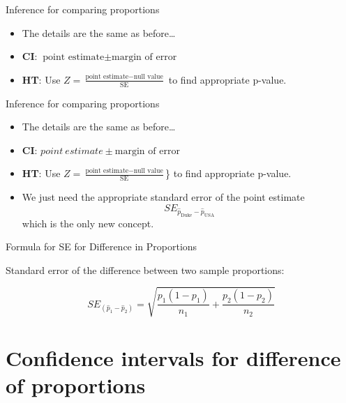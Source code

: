 \documentclass[
  ignorenonframetext,
]{beamer}
\providecommand{\tightlist}{%
  \setlength{\itemsep}{0pt}\setlength{\parskip}{0pt}}
\begin{document}
\begin{frame}{Inference for comparing proportions}
\protect\hypertarget{inference-for-comparing-proportions-2}{}

\begin{itemize}
\tightlist
\item
  The details are the same as before\ldots{}
\item
  \textbf{CI}: \(\text{point estimate} \pm \text{margin of error}\)
\item
  \textbf{HT}: Use
  \(Z = \frac{\text{point estimate} - \text{null value}}{\text{SE}}\) to
  find appropriate p-value.
\end{itemize}

\end{frame}

\begin{frame}{Inference for comparing proportions}
\protect\hypertarget{inference-for-comparing-proportions-3}{}

\begin{itemize}
\tightlist
\item
  The details are the same as before\ldots{}
\item
  \textbf{CI}: \(point~estimate \pm \text{margin of error}\)
\item
  \textbf{HT}: Use
  \(Z = \frac{\text{point estimate} - \text{null value}}{\text{SE}}\)\}
  to find appropriate p-value.
\item
  We just need the appropriate standard error of the point estimate \[
  SE_{ \hat{p}_\text{Duke} - \hat{p}_\text{USA}}
  \] which is the only new concept.
\end{itemize}

\end{frame}

\begin{frame}{Formula for SE for Difference in Proportions}
\protect\hypertarget{formula-for-se-for-difference-in-proportions}{}

Standard error of the difference between two sample proportions:

\[
SE_{(\hat{p}_1 - \hat{p}_2)} = \sqrt{ \frac{p_1(1-p_1)}{n_1} + \frac{p_2(1-p_2)}{n_2} } 
\]

\end{frame}

\hypertarget{confidence-intervals-for-difference-of-proportions}{%
\section{Confidence intervals for difference of
proportions}\label{confidence-intervals-for-difference-of-proportions}}
\end{document}
